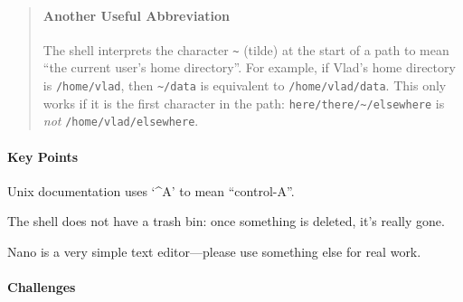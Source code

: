 \documentclass{book}
\begin{document}
\begin{quote}
\mbox{}\paragraph{Another Useful Abbreviation}

The shell interprets the character \texttt{\textasciitilde{}} (tilde) at
the start of a path to mean ``the current user's home directory''. For
example, if Vlad's home directory is \texttt{/home/vlad}, then
\texttt{\textasciitilde{}/data} is equivalent to
\texttt{/home/vlad/data}. This only works if it is the first character
in the path: \texttt{here/there/\textasciitilde{}/elsewhere} is
\emph{not} \texttt{/home/vlad/elsewhere}.
\end{quote}

\mbox{}\paragraph{Key Points}

\begin{swcitemize}
\item
  Unix documentation uses `\^{}A' to mean ``control-A''.
\item
  The shell does not have a trash bin: once something is deleted, it's
  really gone.
\item
  Nano is a very simple text editor---please use something else for real
  work.
\end{swcitemize}

\mbox{}\paragraph{Challenges}
\end{document}
